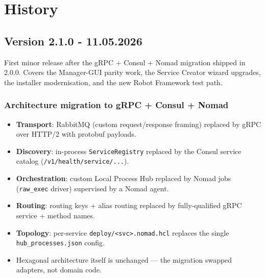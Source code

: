 %
%
%
%
%

\section{History}

\subsection{Version 2.1.0 - 11.05.2026}

First minor release after the gRPC + Consul + Nomad migration shipped
in 2.0.0.  Covers the Manager-GUI parity work, the Service Creator
wizard upgrades, the installer modernisation, and the new Robot
Framework test path.

\subsubsection{Architecture migration to gRPC + Consul + Nomad}

\begin{itemize}
   \item \textbf{Transport}: RabbitMQ (custom request/response framing) replaced by
         gRPC over HTTP/2 with protobuf payloads.
   \item \textbf{Discovery}: in-process \texttt{ServiceRegistry} replaced by the
         Consul service catalog (\texttt{/v1/health/service/...}).
   \item \textbf{Orchestration}: custom Local Process Hub replaced by Nomad jobs
         (\texttt{raw\_exec} driver) supervised by a Nomad agent.
   \item \textbf{Routing}: routing keys + alias routing replaced by
         fully-qualified gRPC service + method names.
   \item \textbf{Topology}: per-service \texttt{deploy/<svc>.nomad.hcl} replaces the
         single \texttt{hub\_processes.json} config.
   \item Hexagonal architecture itself is unchanged --- the migration swapped
         adapters, not domain code.
\end{itemize}

